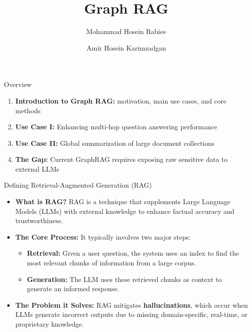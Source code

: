 \documentclass[aspectratio=169,xcolor=dvipsnames]{beamer}
\title{Graph RAG}
\author{Mohammad Hosein Rabiee \and Amir Hosein Karimzadgan}
\institute{Department of Computer Science and Statistics \\ Faculty of Mathematics \\ K. N. Toosi University of Technology}
\date{}
\begin{document}
	
	\begin{frame}
		\titlepage
	\end{frame}
	
	\begin{frame}{Overview}
		
		\vspace{0.6em}
		
		\begin{enumerate}
			\item \textbf{Introduction to Graph RAG:} motivation, main use cases, and core methods
			\item \textbf{Use Case I:} Enhancing multi‑hop question answering performance
			\item \textbf{Use Case II:} Global summarization of large document collections
			\item \textbf{The Gap:} Current GraphRAG requires exposing raw sensitive data to external LLMs
		\end{enumerate}
		
	\end{frame}
	
	\begin{frame}{Defining Retrieval-Augmented Generation (RAG)}
		
		\small
		
		\begin{itemize}
			\item \textbf{\textcolor{blue!80}{What is RAG?}}  
			RAG is a technique that supplements Large Language Models (LLMs) with external knowledge to enhance factual accuracy and trustworthiness.
			
			\vspace{0.2cm}
			
			\item \textbf{\textcolor{blue!80}{The Core Process:}}  
			It typically involves two major steps:
			\begin{itemize}
				\item \textbf{\textcolor{teal!80}{Retrieval:}}  
				Given a user question, the system uses an index to find the most relevant chunks of information from a large corpus.
				
				\item \textbf{\textcolor{teal!80}{Generation:}}  
				The LLM uses these retrieved chunks as context to generate an informed response.
			\end{itemize}
			
			\vspace{0.2cm}
			
			\item \textbf{\textcolor{blue!80}{The Problem it Solves:}}  
			RAG mitigates \textbf{\textcolor{red!70}{hallucinations}}, which occur when LLMs generate incorrect outputs due to missing domain-specific, real-time, or proprietary knowledge.
		\end{itemize}
		
	\end{frame}
	
\end{document}
